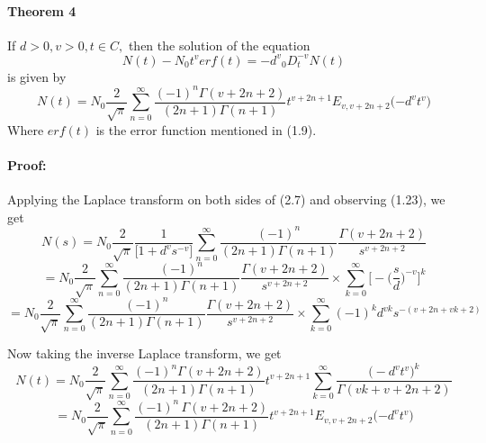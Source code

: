 \documentclass{article}
\begin{document}
\paragraph{Theorem 4}
If $d > 0, v > 0, t \in C,$ then the solution of the equation
\begin{equation}
    N(t) - N_0{t^v}erf(t) = {-d^v}{_0D_t^{-v}}N(t)
\end{equation}
is given by
\begin{equation}
    N(t) = N_0
    \frac{2}{\sqrt{\pi}}
    \sum_{n = 0}^{\infty}
    \frac{{(-1)^n}\Gamma{(v+2n+2)}}{{(2n+1)}\Gamma{(n+1)}}
    t^{v+2n+1}
    E_{v,v+2n+2}
    \Big({-d^v}{t^v}\Big)
\end{equation}
Where $erf(t)$ is the error function mentioned in (1.9).
\paragraph{Proof:}
Applying the Laplace transform on both sides of (2.7) and observing (1.23), we get
\begin{equation*}
    N(s)=N_0
    \frac{2}{\sqrt{\pi}}
    \frac{1}{\Big[1+{d^v}{s^{-v}}\Big]}
    \sum_{n = 0}^{\infty}
    \frac{(-1)^n}{(2n+1)\Gamma{(n+1)}}
    \frac{\Gamma{(v+2n+2)}}{s^{v+2n+2}}
\end{equation*}
\begin{equation*}
    =N_0
    \frac{2}{\sqrt{\pi}}
    \sum_{n = 0}^{\infty}
    \frac{{(-1)^n}}{(2n+1)\Gamma{(n+1)}}
    \frac{\Gamma{(v+2n+2)}}{s^{v+2n+2}}
    \times
    \sum_{k=0}^{\infty}
    \bigg[
        -{\bigg(\frac{s}{d}\bigg)^{-v}}
    \bigg]^k
\end{equation*}
\begin{equation*}
    =N_0
    \frac{2}{\sqrt{\pi}}
    \sum_{n = 0}^{\infty}
    \frac{{(-1)^n}}{(2n+1)\Gamma{(n+1)}}
    \frac{\Gamma{(v+2n+2)}}{s^{v+2n+2}}
    \times
    \sum_{k=0}^{\infty}
    {(-1)^k}{d^{vk}}{s^{-(v+2n+vk+2)}}
\end{equation*}

Now taking the inverse Laplace transform, we get
\begin{equation*}
    N(t)=N_0
    \frac{2}{\sqrt{\pi}}
    \sum_{n = 0}^{\infty}
    \frac{{(-1)^n}\Gamma{(v+2n+2)}}{(2n+1)\Gamma{(n+1)}}
    t^{v+2n+1}
    {\sum_{k=0}^{\infty}}
    \frac{\big(-{d^v} {t^v}\big)^k}{\Gamma{(vk+v+2n+2)}}
\end{equation*}
\begin{equation*}
={N_0}\frac{2}{\sqrt{\pi}}
    \sum_{n = 0}^{\infty}
\frac{{(-1)^n\,\Gamma{(v+2n+2)}}}{(2n+1)\Gamma{(n+1)}}
    t^{v+2n+1}
    E_{v,v+2n+2}
    \Big({-d^v}{t^v}\Big)
\end{equation*}
\end{document}
